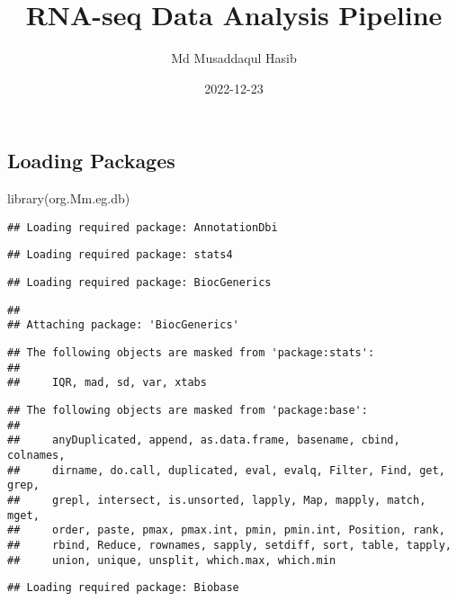\documentclass[
]{article}
\title{RNA-seq Data Analysis Pipeline}
\author{Md Musaddaqul Hasib}
\date{2022-12-23}
\newenvironment{Shaded}{\begin{snugshade}}{\end{snugshade}}
\newcommand{\FunctionTok}[1]{\textcolor[rgb]{0.00,0.00,0.00}{#1}}
\newcommand{\NormalTok}[1]{#1}
\begin{document}
\maketitle

\hypertarget{loading-packages}{%
\subsection{Loading Packages}\label{loading-packages}}

\begin{Shaded}
\begin{Highlighting}[]
\FunctionTok{library}\NormalTok{(org.Mm.eg.db)}
\end{Highlighting}
\end{Shaded}

\begin{verbatim}
## Loading required package: AnnotationDbi
\end{verbatim}

\begin{verbatim}
## Loading required package: stats4
\end{verbatim}

\begin{verbatim}
## Loading required package: BiocGenerics
\end{verbatim}

\begin{verbatim}
## 
## Attaching package: 'BiocGenerics'
\end{verbatim}

\begin{verbatim}
## The following objects are masked from 'package:stats':
## 
##     IQR, mad, sd, var, xtabs
\end{verbatim}

\begin{verbatim}
## The following objects are masked from 'package:base':
## 
##     anyDuplicated, append, as.data.frame, basename, cbind, colnames,
##     dirname, do.call, duplicated, eval, evalq, Filter, Find, get, grep,
##     grepl, intersect, is.unsorted, lapply, Map, mapply, match, mget,
##     order, paste, pmax, pmax.int, pmin, pmin.int, Position, rank,
##     rbind, Reduce, rownames, sapply, setdiff, sort, table, tapply,
##     union, unique, unsplit, which.max, which.min
\end{verbatim}

\begin{verbatim}
## Loading required package: Biobase
\end{verbatim}
\end{document}
